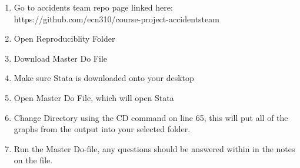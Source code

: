 \documentclass[12pt]{article}
\begin{document}
\begin{enumerate}
  \item Go to accidents team repo page linked here: 
  https://github.com/ecn310/course-project-accidentsteam
  \item Open Reproduciblity Folder
  \item Download Master Do File 
  \item Make sure Stata is downloaded onto your desktop
  \item Open Master Do File, which will open Stata
  \item Change Directory using the CD command on line 65, this will put all of the graphs from the output into your selected folder. 
  \item Run the Master Do-file, any questions should be answered within in the notes on the file. 
  
\end{enumerate}
\end{document}
